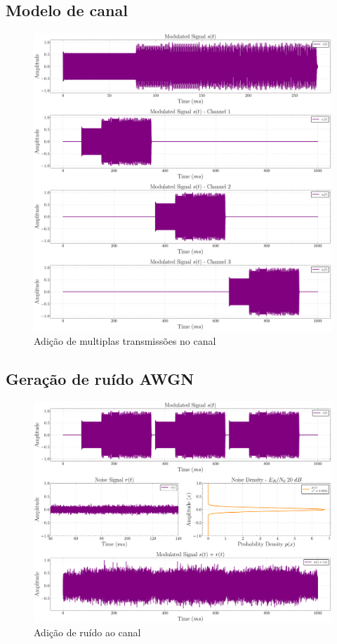 \subsection{Modelo de canal}\label{sec:modelo_canal}

\begin{figure}[H]
	\centering
	\caption{Adição de multiplas transmissões no canal}\label{fig:channel_time}
	\includegraphics[width=\linewidth]{assets/cap3/example_channel_time_subchannels.pdf}
\end{figure}

\subsection{Geração de ruído AWGN}\label{sec:geracao_ruido}

\begin{figure}[H]
	\centering
	\caption{Adição de ruído ao canal}\label{fig:add_noise_time}
	\includegraphics[width=\linewidth]{assets/cap3/example_channel_time_channel.pdf}
\end{figure}

